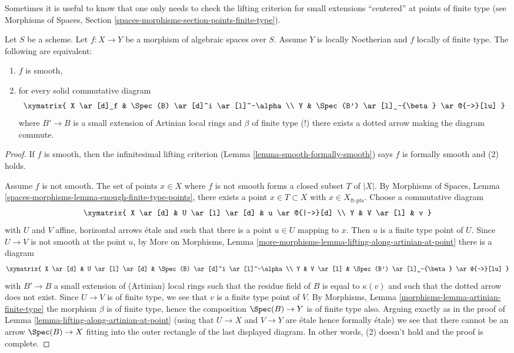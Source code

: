 \noindent
Sometimes it is useful to know that one only needs to check the
lifting criterion for small extensions ``centered'' at points
of finite type (see
Morphisms of Spaces, Section \ref{spaces-morphisms-section-points-finite-type}).

\begin{lemma}
\label{lemma-lifting-along-artinian}
Let $S$ be a scheme. Let $f : X \to Y$ be a morphism of algebraic spaces
over $S$. Assume $Y$ is locally Noetherian and $f$ locally of finite type.
The following are equivalent:
\begin{enumerate}
\item $f$ is smooth,
\item for every solid commutative diagram
$$
\xymatrix{
X \ar[d]_f & \Spec(B) \ar[d]^i \ar[l]^-\alpha \\
Y & \Spec(B') \ar[l]_-{\beta} \ar@{-->}[lu]
}
$$
where $B' \to B$ is a small extension of Artinian local rings
and $\beta$ of finite type (!) there exists a dotted arrow making
the diagram commute.
\end{enumerate}
\end{lemma}

\begin{proof}
If $f$ is smooth, then the infinitesimal lifting criterion
(Lemma \ref{lemma-smooth-formally-smooth}) says
$f$ is formally smooth and (2) holds.

\medskip\noindent
Assume $f$ is not smooth. The set of points $x \in X$ where $f$ is not smooth
forms a closed subset $T$ of $|X|$. By
Morphisms of Spaces, Lemma 
\ref{spaces-morphisms-lemma-enough-finite-type-points}, there exists
a point $x \in T \subset X$ with $x \in X_{\text{ft-pts}}$. Choose a
commutative diagram
$$
\xymatrix{
X \ar[d] & U \ar[l] \ar[d] & u \ar@{|->}[d] \\
Y & V \ar[l] & v
}
$$
with $U$ and $V$ affine, horizontal arrows \'etale and
such that there is a point $u \in U$ mapping to $x$. Then $u$
is a finite type point of $U$. Since $U \to V$ is not smooth at
the point $u$, by
More on Morphisms,
Lemma \ref{more-morphisms-lemma-lifting-along-artinian-at-point}
there is a diagram
$$
\xymatrix{
X \ar[d] & U \ar[l] \ar[d] & \Spec(B) \ar[d]^i \ar[l]^-\alpha  \\
Y & V \ar[l] & \Spec(B') \ar[l]_-{\beta} \ar@{-->}[lu]
}
$$
with $B' \to B$ a small extension of (Artinian) local rings
such that the residue field of $B$ is equal to $\kappa(v)$ and such
that the dotted arrow does not exist. Since $U \to V$ is
of finite type, we see that $v$ is a finite type point of $V$. By
Morphisms, Lemma \ref{morphisms-lemma-artinian-finite-type}
the morphism $\beta$ is of finite type, hence the composition
$\Spec(B) \to Y$ is of finite type also.
Arguing exactly as in the proof of
Lemma \ref{lemma-lifting-along-artinian-at-point}
(using that $U \to X$ and $V \to Y$ are \'etale hence
formally \'etale)
we see that there cannot be an arrow $\Spec(B) \to X$
fitting into the outer rectangle of the last displayed diagram.
In other words, (2) doesn't hold and the proof is complete.
\end{proof}

